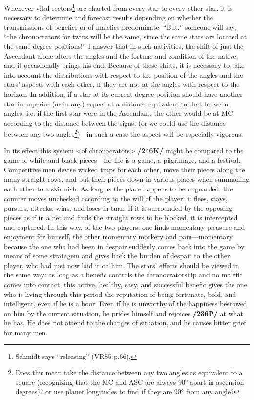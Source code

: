 Whenever vital sectors\footnote{Schmidt says ``releasing'' (VRS5 p.66).} are charted from every star to every other star, it is necessary to determine and forecast results depending on whether the transmissions of benefics or of malefics predominate.
“But,” someone will say, “the chronocrators for twins will be the same, since the same stars are located at the same degree-positions!” I answer that in such nativities, the shift of just the Ascendant alone
alters the angles and the fortune and condition of the native, and it occasionally brings his end. Because of these shifts, it is necessary to take into account the distributions with respect to the position of the angles and the stars’ aspects with each other, if they are not at the angles with respect to the horizon. In addition, if a star at its current degree-position should have another star in superior (or in any) aspect at a distance equivalent to that between angles, i.e. if the first star were in the Ascendant, the other would be at MC according to the distance between the signs, (or we could use the distance between any two angles\footnote{Does this mean take the distance between any two angles as equivalent to a square (recognizing that the MC and ASC are always 90° apart in ascension degrees)? or use planet longitudes to find if they are 90° from any angle?})—in such a case the aspect will be especially vigorous.

In its effect this system <of chronocrators> \textbf{/246K/} might be compared to the game of white and black pieces—for life is a game, a pilgrimage, and a festival. Competitive men devise wicked traps for each other, move their pieces along the many straight rows, and put their pieces down in various places when summoning each other to a skirmish. As long as the place happens to be unguarded, the counter moves unchecked according to the will of the player: it flees, stays, pursues, attacks, wins, and loses in turn. If it is surrounded by the opposing pieces as if in a net and finds the straight rows to be blocked, it is intercepted and captured. In this way, of the two players, one finds momentary pleasure and enjoyment for himself, the other momentary mockery and pain—momentary because the one who had been in despair suddenly comes back into the game by means of some stratagem and gives back the burden of despair to the other player, who had just now laid it on him. The stars’ effects should be viewed in the same way: as long as a benefic controls the chronocratorship
and no malefic comes into contact, this active, healthy, easy, and successful benefic gives the one who is living through this period the reputation of being fortunate, bold, and intelligent, even if he is a boor.
Even if he is unworthy of the happiness bestowed on him by the current situation, he prides himself and rejoices \textbf{/236P/} at what he has. He does not attend to the changes of situation, and he causes bitter grief for many men. 

